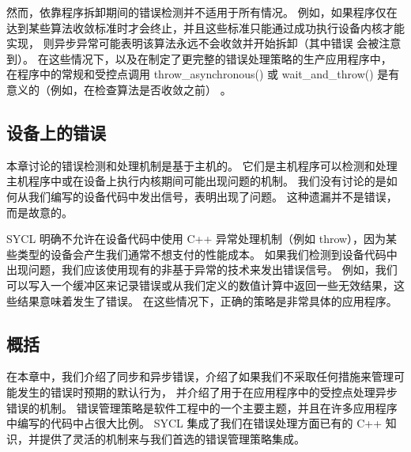然而，依靠程序拆卸期间的错误检测并不适用于所有情况。 
例如，如果程序仅在达到某些算法收敛标准时才会终止，并且这些标准只能通过成功执行设备内核才能实现，
则异步异常可能表明该算法永远不会收敛并开始拆卸（其中错误 会被注意到）。 
在这些情况下，以及在制定了更完整的错误处理策略的生产应用程序中，
在程序中的常规和受控点调用 throw\_asynchronous() 
或 wait\_and\_throw() 是有意义的（例如，在检查算法是否收敛之前） 。

\subsection{设备上的错误}
本章讨论的错误检测和处理机制是基于主机的。 
它们是主机程序可以检测和处理主机程序中或在设备上执行内核期间可能出现问题的机制。 
我们没有讨论的是如何从我们编写的设备代码中发出信号，表明出现了问题。 这种遗漏并不是错误，而是故意的。

SYCL 明确不允许在设备代码中使用 C++ 异常处理机制（例如 throw），因为某些类型的设备会产生我们通常不想支付的性能成本。 
如果我们检测到设备代码中出现问题，我们应该使用现有的非基于异常的技术来发出错误信号。 
例如，我们可以写入一个缓冲区来记录错误或从我们定义的数值计算中返回一些无效结果，这些结果意味着发生了错误。 
在这些情况下，正确的策略是非常具体的应用程序。

\subsection{概括}
在本章中，我们介绍了同步和异步错误，介绍了如果我们不采取任何措施来管理可能发生的错误时预期的默认行为，
并介绍了用于在应用程序中的受控点处理异步错误的机制。 
错误管理策略是软件工程中的一个主要主题，并且在许多应用程序中编写的代码中占很大比例。 
SYCL 集成了我们在错误处理方面已有的 C++ 知识，并提供了灵活的机制来与我们首选的错误管理策略集成。